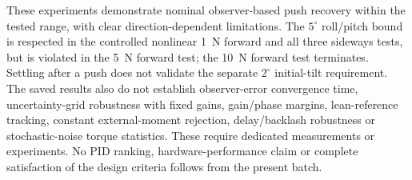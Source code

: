 These experiments demonstrate nominal observer-based push recovery within the tested range, with clear direction-dependent limitations. The $5^\circ$ roll/pitch bound is respected in the controlled nonlinear 1~N forward and all three sideways tests, but is violated in the 5~N forward test; the 10~N forward test terminates. Settling after a push does not validate the separate $2^\circ$ initial-tilt requirement. The saved results also do not establish observer-error convergence time, uncertainty-grid robustness with fixed gains, gain/phase margins, lean-reference tracking, constant external-moment rejection, delay/backlash robustness or stochastic-noise torque statistics. These require dedicated measurements or experiments. No PID ranking, hardware-performance claim or complete satisfaction of the design criteria follows from the present batch.
